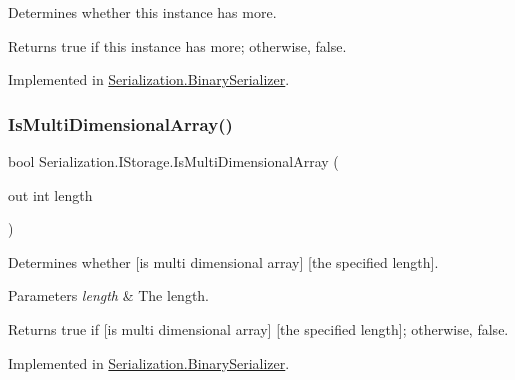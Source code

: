 Determines whether this instance has more. 

\begin{DoxyReturn}{Returns}
{\ttfamily true} if this instance has more; otherwise, {\ttfamily false}.
\end{DoxyReturn}


Implemented in \hyperlink{class_serialization_1_1_binary_serializer_a17489c518844ba789eed665e716db38d}{Serialization.\+Binary\+Serializer}.

\mbox{\label{interface_serialization_1_1_i_storage_a9fd65cc423dabd2b49021e0e7f333356}} 
\subsubsection{\texorpdfstring{Is\+Multi\+Dimensional\+Array()}{IsMultiDimensionalArray()}}
{\footnotesize\ttfamily bool Serialization.\+I\+Storage.\+Is\+Multi\+Dimensional\+Array (\begin{DoxyParamCaption}\item[{out int}]{length }\end{DoxyParamCaption})}



Determines whether \mbox{[}is multi dimensional array\mbox{]} \mbox{[}the specified length\mbox{]}. 


\begin{DoxyParams}{Parameters}
{\em length} & The length.\\
\hline
\end{DoxyParams}
\begin{DoxyReturn}{Returns}
{\ttfamily true} if \mbox{[}is multi dimensional array\mbox{]} \mbox{[}the specified length\mbox{]}; otherwise, {\ttfamily false}.
\end{DoxyReturn}


Implemented in \hyperlink{class_serialization_1_1_binary_serializer_a87e06dfca74d1ebc475999bd0c2f9596}{Serialization.\+Binary\+Serializer}.

\mbox{\label{interface_serialization_1_1_i_storage_a395cc4c40bd55229df264d4187ebb018}} 
